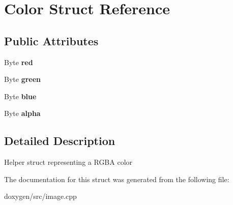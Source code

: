 \hypertarget{struct_color}{}\section{Color Struct Reference}
\label{struct_color}
\subsection*{Public Attributes}
\begin{DoxyCompactItemize}
\item 
\mbox{\label{struct_color_af84e8322aff195c692b0e5cf9ed01fe1}} 
Byte {\bfseries red}
\item 
\mbox{\label{struct_color_a8a10c15fc75f5e90263b7fa4eb1c8e36}} 
Byte {\bfseries green}
\item 
\mbox{\label{struct_color_ac17c1186b4303d3a1b1660efe50ebb7d}} 
Byte {\bfseries blue}
\item 
\mbox{\label{struct_color_ae09a94d77a6169697f6e71a62bee5b8c}} 
Byte {\bfseries alpha}
\end{DoxyCompactItemize}


\subsection{Detailed Description}
Helper struct representing a R\+G\+BA color 

The documentation for this struct was generated from the following file\+:\begin{DoxyCompactItemize}
\item 
doxygen/src/image.\+cpp\end{DoxyCompactItemize}
